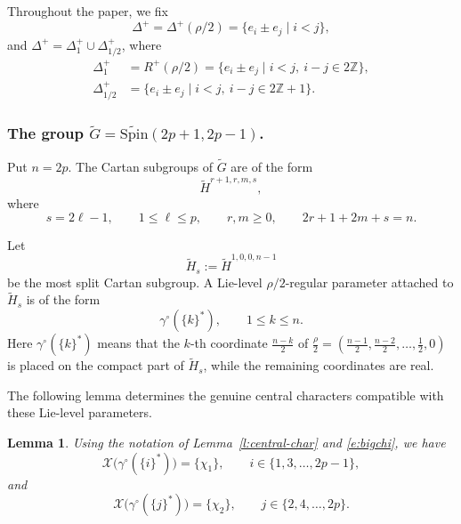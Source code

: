 \documentclass{amsart}
\newcommand{\Spin}{{\mathrm{Spin}}}
\newtheorem{lemma}[thm]{Lemma}
\theoremstyle{definition}
\begin{document}
Throughout the paper, we fix
\begin{equation*}
\Delta^+=\Delta^+(\rho/2)=\{e_i\pm e_j\mid i<j\},
\end{equation*}
and $\Delta ^+ = \Delta_1^+\cup \Delta_{1/2}^+$, where
\begin{align*}
\Delta_1^+
&=
R^+(\rho/2)
=\{e_i\pm e_j\mid i<j,\ i-j\in 2\mathbb Z\},\\
\Delta_{1/2}^+
&=
\{e_i\pm e_j\mid i<j,\ i-j\in 2\mathbb Z+1\}.
\end{align*}







\subsubsection{The group
\(\widetilde G=\widetilde{\Spin}(2p+1,2p-1)\).}

Put \(n=2p\). The Cartan subgroups of \(\widetilde G\) are of the form
\[
\widetilde H^{r+1,r,m,s},
\]
where
\[
s=2\ell-1,\qquad 1\leq \ell\leq p,
\qquad r,m\geq 0,
\qquad
2r+1+2m+s=n.
\]

Let
\[
\widetilde H_s:=\widetilde H^{1,0,0,n-1}
\]
be the most split Cartan subgroup. A Lie-level
\(\rho/2\)-regular parameter attached to \(\widetilde H_s\) is of the
form
\[
\gamma^\circ(\{k\}^*),\qquad 1\leq k\leq n.
\]
Here \(\gamma^\circ(\{k\}^*)\) means that the \(k\)-th coordinate
$\displaystyle\frac{n-k}{2}$
of
$\displaystyle\frac{\rho}{2}
=
\left(
\frac{n-1}{2},\frac{n-2}{2},\ldots,\frac12,0
\right)$
is placed on the compact part of \(\widetilde H_s\), while the
remaining coordinates are real.

The following lemma determines the genuine central characters
compatible with these Lie-level parameters.



\begin{lemma} \label{l:2p+12p-1-cenchar-comp}
Using the notation of Lemma~\ref{l:central-char} and
\eqref{e:bigchi}, we have
\[
\mathcal X\bigl(\gamma^\circ(\{i\}^*)\bigr)
=
\{\chi_1\},
\qquad
i\in\{1,3,\ldots,2p-1\},
\]
and
\[
\mathcal X\bigl(\gamma^\circ(\{j\}^*)\bigr)
=
\{\chi_2\},
\qquad
j\in\{2,4,\ldots,2p\}.
\]
\end{lemma}
\end{document}

